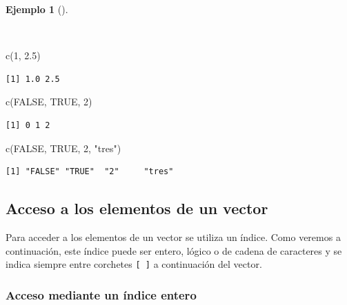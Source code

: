\documentclass[
  a4paper,
]{scrreport}
\newenvironment{Shaded}{\begin{snugshade}}{\end{snugshade}}
\newcommand{\ConstantTok}[1]{\textcolor[rgb]{0.56,0.35,0.01}{#1}}
\newcommand{\DecValTok}[1]{\textcolor[rgb]{0.68,0.00,0.00}{#1}}
\newcommand{\FloatTok}[1]{\textcolor[rgb]{0.68,0.00,0.00}{#1}}
\newcommand{\FunctionTok}[1]{\textcolor[rgb]{0.28,0.35,0.67}{#1}}
\newcommand{\NormalTok}[1]{\textcolor[rgb]{0.00,0.23,0.31}{#1}}
\newcommand{\StringTok}[1]{\textcolor[rgb]{0.13,0.47,0.30}{#1}}
\theoremstyle{definition}
\theoremstyle{definition}
\newtheorem{example}{Ejemplo}[chapter]
\theoremstyle{remark}
\begin{document}
\begin{example}[]\protect\hypertarget{exm-coercion}{}\label{exm-coercion}

~

\begin{Shaded}
\begin{Highlighting}[]
\FunctionTok{c}\NormalTok{(}\DecValTok{1}\NormalTok{, }\FloatTok{2.5}\NormalTok{)}
\end{Highlighting}
\end{Shaded}

\begin{verbatim}
[1] 1.0 2.5
\end{verbatim}

\begin{Shaded}
\begin{Highlighting}[]
\FunctionTok{c}\NormalTok{(}\ConstantTok{FALSE}\NormalTok{, }\ConstantTok{TRUE}\NormalTok{, }\DecValTok{2}\NormalTok{)}
\end{Highlighting}
\end{Shaded}

\begin{verbatim}
[1] 0 1 2
\end{verbatim}

\begin{Shaded}
\begin{Highlighting}[]
\FunctionTok{c}\NormalTok{(}\ConstantTok{FALSE}\NormalTok{, }\ConstantTok{TRUE}\NormalTok{, }\DecValTok{2}\NormalTok{, }\StringTok{"tres"}\NormalTok{)}
\end{Highlighting}
\end{Shaded}

\begin{verbatim}
[1] "FALSE" "TRUE"  "2"     "tres" 
\end{verbatim}

\end{example}

\subsection{Acceso a los elementos de un
vector}\label{acceso-a-los-elementos-de-un-vector}

Para acceder a los elementos de un vector se utiliza un índice. Como
veremos a continuación, este índice puede ser entero, lógico o de cadena
de caracteres y se indica siempre entre corchetes \texttt{{[}\ {]}} a
continuación del vector.

\subsubsection{Acceso mediante un índice
entero}\label{acceso-mediante-un-uxedndice-entero}
\end{document}
